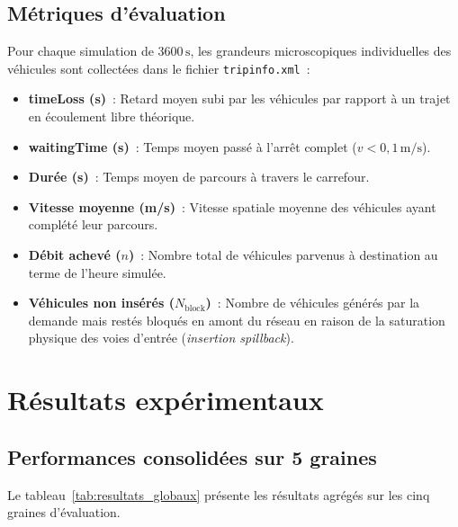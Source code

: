 \documentclass[11pt,a4paper]{article}
\begin{document}
\subsection{Métriques d'évaluation}
Pour chaque simulation de $3600\,\mathrm{s}$, les grandeurs microscopiques individuelles des véhicules sont collectées dans le fichier \texttt{tripinfo.xml}~:
\begin{itemize}[nosep]
    \item \textbf{timeLoss (s)}~: Retard moyen subi par les véhicules par rapport à un trajet en écoulement libre théorique.
    \item \textbf{waitingTime (s)}~: Temps moyen passé à l'arrêt complet ($v < 0{,}1\,\mathrm{m/s}$).
    \item \textbf{Durée (s)}~: Temps moyen de parcours à travers le carrefour.
    \item \textbf{Vitesse moyenne (m/s)}~: Vitesse spatiale moyenne des véhicules ayant complété leur parcours.
    \item \textbf{Débit achevé ($n$)}~: Nombre total de véhicules parvenus à destination au terme de l'heure simulée.
    \item \textbf{Véhicules non insérés ($N_{\text{block}}$)}~: Nombre de véhicules générés par la demande mais restés bloqués en amont du réseau en raison de la saturation physique des voies d'entrée (\emph{insertion spillback}).
\end{itemize}

\section{Résultats expérimentaux}
\label{sec:results}

\subsection{Performances consolidées sur 5 graines}
Le tableau~\ref{tab:resultats_globaux} présente les résultats agrégés sur les cinq graines d'évaluation.
\end{document}

